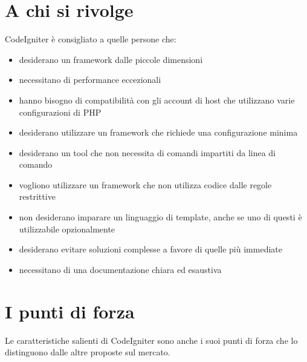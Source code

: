 \section*{A chi si rivolge}
CodeIgniter è consigliato a quelle persone che:

\begin{itemize}
\item desiderano un framework dalle piccole dimensioni
\item necessitano di performance eccezionali
\item hanno bisogno di compatibilità con gli account di host che utilizzano varie configurazioni di \ac{PHP}
\item desiderano utilizzare un framework che richiede una configurazione minima
\item desiderano un tool che non necessita di comandi impartiti da linea di comando
\item vogliono utilizzare un framework che non utilizza codice dalle regole restrittive
\item non desiderano imparare un linguaggio di template, anche se uno di questi è utilizzabile opzionalmente
\item desiderano evitare soluzioni complesse a favore di quelle più immediate
\item necessitano di una documentazione chiara ed esaustiva
\end{itemize}

\section*{I punti di forza}
Le caratteristiche salienti di CodeIgniter sono anche i suoi punti di forza che lo distinguono dalle altre proposte sul mercato.

